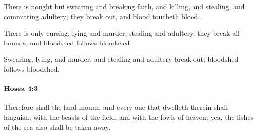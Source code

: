 			\begin{versebox}
					\item[BHS] 
					\item[LXX] 
					\item[ASV] There is nought but swearing and breaking faith, and killing, and stealing, and committing adultery; they break out, and blood toucheth blood.
					\item[NIV] There is only cursing, lying and murder, stealing and adultery; they break all bounds, and bloodshed follows bloodshed.
					\item[NRSV] Swearing, lying, and murder, and stealing and adultery break out; bloodshed follows bloodshed.
			\end{versebox}

		\paragraph{Hosea 4:3} %
			\label{HOSEA-4-3}

			Therefore shall the land mourn, and every one that dwelleth therein shall languish, with the beasts of the field, and with the fowls of heaven; yea, the fishes of the sea also shall be taken away.

